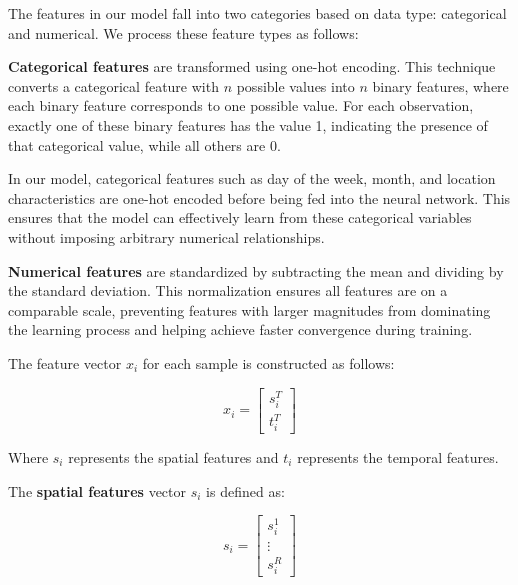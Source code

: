 The features in our model fall into two categories based on data type: categorical and numerical. We process these feature types as follows:

\textbf{Categorical features} are transformed using one-hot encoding. This technique converts a categorical feature with $n$ possible values into $n$ binary features, where each binary feature corresponds to one possible value. For each observation, exactly one of these binary features has the value 1, indicating the presence of that categorical value, while all others are 0.


In our model, categorical features such as day of the week, month, and location characteristics are one-hot encoded before being fed into the neural network. This ensures that the model can effectively learn from these categorical variables without imposing arbitrary numerical relationships.

\textbf{Numerical features} are standardized by subtracting the mean and dividing by the standard deviation. This normalization ensures all features are on a comparable scale, preventing features with larger magnitudes from dominating the learning process and helping achieve faster convergence during training.

The feature vector $x_i$ for each sample is constructed as follows:

\begin{equation}
    \renewcommand*{\arraystretch}{1.5}
    x_i = \begin{bmatrix}
        s_i^T \\
        t_i^T
    \end{bmatrix}
\end{equation}

Where $s_i$ represents the spatial features and $t_i$ represents the temporal features.

The \textbf{spatial features} vector $s_i$ is defined as:

\begin{equation}
    s_i = \begin{bmatrix}
        s_i^1  \\
        \vdots \\
        s_i^R
    \end{bmatrix}
\end{equation}

